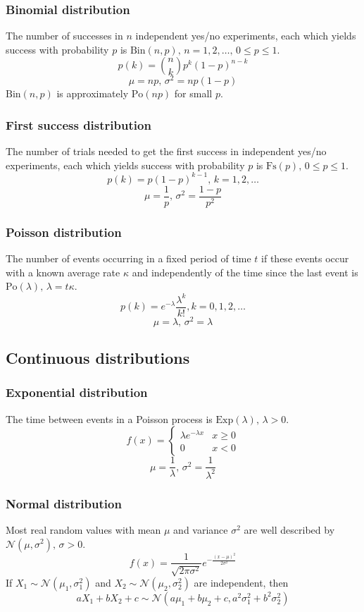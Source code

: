 \subsubsection{Binomial distribution}
The number of successes in $n$ independent yes/no experiments, each which yields success with probability $p$ is $\textrm{Bin}(n,p),\,n=1,2,\dots,\, 0\leq p\leq1$.
\[p(k)=\binom{n}{k}p^k(1-p)^{n-k}\]
\[\mu = np,\,\sigma^2=np(1-p)\]
$\textrm{Bin}(n,p)$ is approximately $\textrm{Po}(np)$ for small $p$.

\subsubsection{First success distribution}
The number of trials needed to get the first success in independent yes/no experiments, each which yields success with probability $p$ is $\textrm{Fs}(p),\,0\leq p\leq1$.
\[p(k)=p(1-p)^{k-1},\,k=1,2,\dots\]
\[\mu = \frac1p,\,\sigma^2=\frac{1-p}{p^2}\]

\subsubsection{Poisson distribution}
The number of events occurring in a fixed period of time $t$ if these events occur with a known average rate $\kappa$ and independently of the time since the last event is $\textrm{Po}(\lambda),\,\lambda=t\kappa$.
\[p(k)=e^{-\lambda}\frac{\lambda^k}{k!}, k=0,1,2,\dots\]
\[\mu=\lambda,\,\sigma^2=\lambda\]

\subsection{Continuous distributions}

\subsubsection{Exponential distribution}
The time between events in a Poisson process is $\textrm{Exp}(\lambda),\,\lambda>0$.
\[f(x) = \left\{
\begin{array}{cl}
\lambda e^{-\lambda x} & x\geq0\\
0 & x<0
\end{array}\right.\]
\[\mu=\frac{1}{\lambda},\,\sigma^2=\frac{1}{\lambda^2}\]

\subsubsection{Normal distribution}
Most real random values with mean $\mu$ and variance $\sigma^2$ are well described by $\mathcal{N}(\mu,\sigma^2),\,\sigma>0$.
\[ f(x) = \frac{1}{\sqrt{2\pi\sigma^2}}e^{-\frac{(x-\mu)^2}{2\sigma^2}} \]
If $X_1 \sim \mathcal{N}(\mu_1,\sigma_1^2)$ and $X_2 \sim \mathcal{N}(\mu_2,\sigma_2^2)$ are independent, then
\[ aX_1 + bX_2 + c \sim \mathcal{N}(a\mu_1+b\mu_2+c,a^2\sigma_1^2+b^2\sigma_2^2) \]


